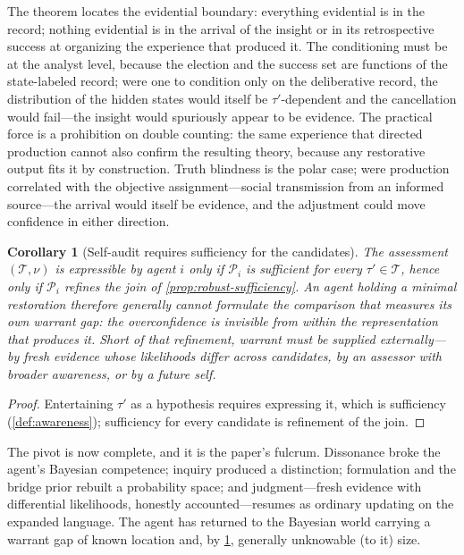 \documentclass[11pt]{article}
\newtheorem{corollary}[assumption]{Corollary}
\theoremstyle{definition}
\begin{document}
The theorem locates the evidential boundary: everything evidential is in the record; nothing evidential is in the arrival of the insight or in its retrospective success at organizing the experience that produced it.
The conditioning must be at the analyst level, because the election and the success set are functions of the state-labeled record; were one to condition only on the deliberative record, the distribution of the hidden states would itself be $\tau'$-dependent and the cancellation would fail---the insight would spuriously appear to be evidence.
The practical force is a prohibition on double counting: the same experience that directed production cannot also confirm the resulting theory, because any restorative output fits it by construction.
Truth blindness is the polar case; were production correlated with the objective assignment---social transmission from an informed source---the arrival would itself be evidence, and the adjustment could move confidence in either direction.

\begin{corollary}[Self-audit requires sufficiency for the candidates]
\label{cor:self-audit}
The assessment $(\mathcal T,\nu)$ is expressible by agent $i$ only if $\mathcal P_i$ is sufficient for every $\tau'\in\mathcal T$, hence only if $\mathcal P_i$ refines the join of \cref{prop:robust-sufficiency}.
An agent holding a minimal restoration therefore generally cannot formulate the comparison that measures its own warrant gap: the overconfidence is invisible from within the representation that produces it.
Short of that refinement, warrant must be supplied externally---by fresh evidence whose likelihoods differ across candidates, by an assessor with broader awareness, or by a future self.
\end{corollary}

\begin{proof}
Entertaining $\tau'$ as a hypothesis requires expressing it, which is sufficiency (\cref{def:awareness}); sufficiency for every candidate is refinement of the join.
\end{proof}

The pivot is now complete, and it is the paper's fulcrum.
Dissonance broke the agent's Bayesian competence; inquiry produced a distinction; formulation and the bridge prior rebuilt a probability space; and judgment---fresh evidence with differential likelihoods, honestly accounted---resumes as ordinary updating on the expanded language.
The agent has returned to the Bayesian world carrying a warrant gap of known location and, by \cref{cor:self-audit}, generally unknowable (to it) size.
\end{document}
